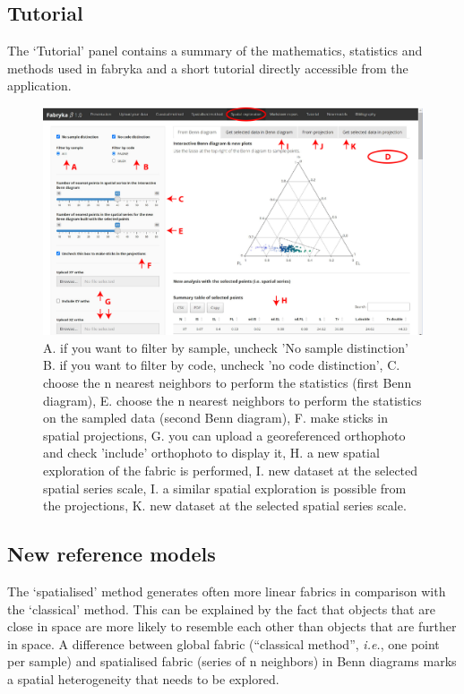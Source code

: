 \documentclass[
]{article}
\begin{document}
\subsection{Tutorial}\label{tutorial}

The `Tutorial' panel contains a summary of the mathematics, statistics
and methods used in fabryka and a short tutorial directly accessible
from the application. \bigbreak

\begin{figure} [h]
\centering
  \includegraphics[width=16cm]{figure/spatial_exploration.jpg}
  \caption{A. if you want to filter by sample, uncheck 'No sample distinction' B. if you want to filter by code, uncheck 'no code distinction', C. choose the n nearest neighbors to perform the statistics (first Benn diagram), E. choose the n nearest neighbors to perform the statistics on the sampled data (second Benn diagram), F. make sticks in spatial projections, G. you can upload a georeferenced orthophoto and check 'include' orthophoto to display it, H. a new spatial exploration of the fabric is performed, I. new dataset at the selected spatial series scale, I. a similar spatial exploration is possible from the projections, K. new dataset at the selected spatial series scale.}
\label{fig:figure_spatial_exploration}
\end{figure}

\subsection{New reference models}\label{new-reference-models}

The `spatialised' method generates often more linear fabrics in
comparison with the `classical' method. This can be explained by the
fact that objects that are close in space are more likely to resemble
each other than objects that are further in space. A difference between
global fabric (``classical method'', \emph{i.e.}, one point per sample)
and spatialised fabric (series of n neighbors) in Benn diagrams marks a
spatial heterogeneity that needs to be explored.
\end{document}
